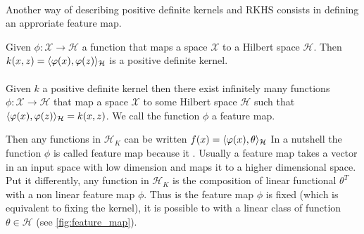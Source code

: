 \paragraph{}
Another way of describing positive definite kernels and \acs{RKHS} consists in
defining an approriate feature map.
\begin{theorem}
    Given $\phi: \mathcal{X} \to \mathcal{H}$ a function that maps a space
    $\mathcal{X}$ to a Hilbert space $\mathcal{H}$. Then
    $k(x,z)=\langle\varphi(x), \varphi(z)\rangle_{\mathcal{H}}$ is a positive definite
    kernel.
    \paragraph{}
    Given $k$ a positive definite kernel then there exist infinitely many
    functions $\phi: \mathcal{X} \to \mathcal{H}$ that map a space
    $\mathcal{X}$ to some Hilbert space $\mathcal{H}$ such that
    $\langle\varphi(x), \varphi(z)\rangle_{\mathcal{H}}=k(x,z)$. We call the function
    $\phi$ a feature map.
\end{theorem}
Then any functions in $\mathcal{H}_K$ can be written $f(x)=\langle\varphi(x),
\theta\rangle_{\mathcal{H}}$ In a nutshell the function $\phi$ is called feature map
because it . Usually a
feature map takes a vector in an input space with low dimension and maps it to
a higher dimensional space. Put it differently, any function in $\mathcal{H}_K$
is the composition of linear functional $\theta^T$ with a non linear feature
map $\phi$. Thus is the feature map $\phi$ is fixed (which is equivalent to
fixing the kernel), it is possible to  with a linear class of
function $\theta\in\mathcal{H}$ (see \cref{fig:feature_map}). 

